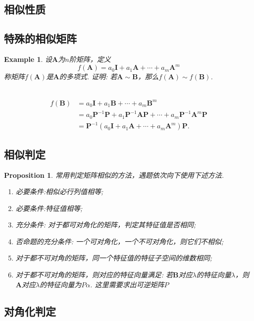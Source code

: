 \documentclass{article}
\newtheorem{proposition}[theorem]{Proposition}
\newtheorem{example}[theorem]{Example}
\newcommand{\hints}{{\color{blue} \text{hints}}}
\newcommand{\mbf}[1]{\bm{#1}}
\begin{document}
\subsection{相似性质}

\subsection{特殊的相似矩阵}

\begin{example}
\rm 设$\mbf{A}$为$n$阶矩阵，定义
$$
f(\mbf{A}) = a_0\mbf{I} + a_1\mbf{A} + \cdots + a_m\mbf{A}^m 
$$
称矩阵$f(\mbf{A})$是$\mbf{A}$的多项式. 证明: 若$\mbf{A} \sim \mbf{B}$，那么$f(\mbf{A}) \sim f(\mbf{B})$. 

\hints\ 
$$
\begin{array}{ll}
f(\mbf{B}) &= a_0\mbf{I} + a_1\mbf{B} + \cdots + a_m\mbf{B}^m \\
&= a_0\mbf{P}^{-1}\mbf{P} + a_1\mbf{P}^{-1}\mbf{A}\mbf{P} + \cdots + a_m\mbf{P}^{-1}\mbf{A}^m\mbf{P} \\
&=\mbf{P}^{-1}(a_0\mbf{I} + a_1\mbf{A} + \cdots + a_m\mbf{A}^m) \mbf{P}.
\end{array}
$$
\end{example}




\subsection{相似判定}

\begin{proposition}
\rm 常用判定矩阵相似的方法，遇题依次向下使用下述方法.
\begin{enumerate}
	\item 必要条件:相似必行列值相等;
	\item 必要条件:特征值相等;
	\item 充分条件: 对于都可对角化的矩阵，判定其特征值是否相同;
	\item 否命题的充分条件: 一个可对角化，一个不可对角化，则它们不相似;
	\item 对于都不可对角的矩阵，同一个特征值的特征子空间的维数相同;	
	\item 对于都不可对角的矩阵，则对应的特征向量满足: 若$\mbf{B}$对应$\lambda$的特征向量$\lambda$，则$\mbf{A}$对应$\lambda$的特征向量为$P\alpha$. 这里需要求出可逆矩阵$P$
\end{enumerate}
\end{proposition}


\subsection{对角化判定}
\end{document}

